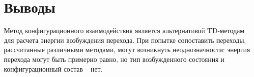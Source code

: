 \section{Выводы}
Метод конфигурационного взаимодействия является альтернативой TD-методам для расчета энергии возбуждения перехода. При попытке сопоставить переходы, рассчитанные различными методами, могут возникнуть неоднозначности: энергия перехода могут быть примерно равно, но тип возбужденного состояния и конфигурационный состав -- нет. 